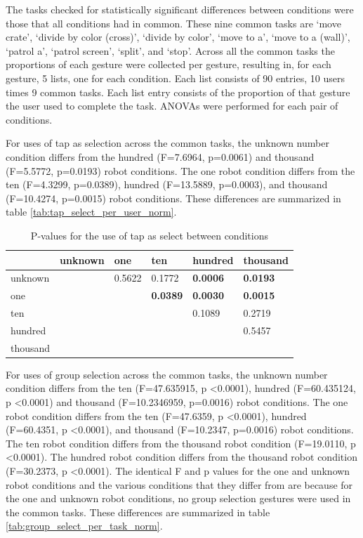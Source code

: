The tasks checked for statistically significant differences between conditions were those that all conditions had in common. 
These nine common tasks are `move crate', `divide by color (cross)', `divide by color', `move to a', `move to a (wall)', `patrol a', `patrol screen', `split', and `stop'. 
Across all the common tasks the proportions of each gesture were collected per gesture, resulting in, for each gesture, 5 lists, one for each condition. Each list consists of 90 entries, 10 users times 9 common tasks. Each list entry consists of the proportion of that gesture the user used to complete the task. ANOVAs were performed for each pair of conditions. 

For uses of tap as selection across the common tasks, the unknown number condition differs from the hundred (F=7.6964, p=0.0061) and thousand (F=5.5772, p=0.0193) robot conditions. 
The one robot condition differs from the ten (F=4.3299, p=0.0389), hundred (F=13.5889, p=0.0003), and thousand (F=10.4274, p=0.0015) robot conditions.
These differences are summarized in table \ref{tab:tap_select_per_user_norm}.

\begin{table}
	\begin{tabular}{l|l l l l l}
		& unknown & one    & ten        & hundred     & thousand   \\ 
		\hline
		unknown & & 0.5622 & 0.1772 & \textbf{0.0006} & \textbf{0.0193} \\   
		one & & & \textbf{0.0389} & \textbf{0.0030} & \textbf{0.0015} \\
		ten & & & & 0.1089 & 0.2719   \\
		hundred & & & & & 0.5457   \\
		thousand & & & & &\\
	\end{tabular}
	\caption{P-values for the use of tap as select between conditions}
	\label{tab:tap_select_per_task_norm}
\end{table}

For uses of group selection across the common tasks, the unknown number condition differs from the ten (F=47.635915, p \textless 0.0001), hundred (F=60.435124, p \textless 0.0001) and thousand (F=10.2346959, p=0.0016) robot conditions. 
The one robot condition differs from the ten (F=47.6359, p \textless 0.0001), hundred (F=60.4351, p \textless 0.0001), and thousand (F=10.2347, p=0.0016) robot conditions.
The ten robot condition differs from the thousand robot condition (F=19.0110, p \textless 0.0001).
The hundred robot condition differs from the thousand robot condition (F=30.2373, p \textless 0.0001).
The identical F and p values for the one and unknown robot conditions and the various conditions that they differ from are because for the one and unknown robot conditions, no group selection gestures were used in the common tasks. 
These differences are summarized in table \ref{tab:group_select_per_task_norm}.


